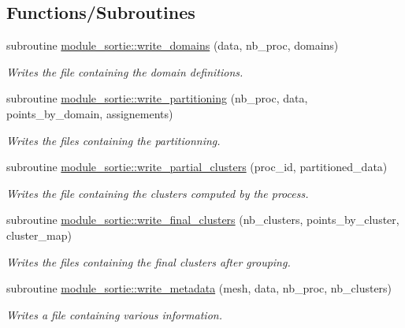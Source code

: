 \subsection*{Functions/\+Subroutines}
\begin{DoxyCompactItemize}
\item 
subroutine \hyperlink{namespacemodule__sortie_a835f7338c29161d6893c6bbddf4174f4}{module\+\_\+sortie\+::write\+\_\+domains} (data, nb\+\_\+proc, domains)
\begin{DoxyCompactList}\small\item\em Writes the file containing the domain definitions. \end{DoxyCompactList}\item 
subroutine \hyperlink{namespacemodule__sortie_abd1cdf529e5c71b3186c8d980e3d5117}{module\+\_\+sortie\+::write\+\_\+partitioning} (nb\+\_\+proc, data, points\+\_\+by\+\_\+domain, assignements)
\begin{DoxyCompactList}\small\item\em Writes the files containing the partitionning. \end{DoxyCompactList}\item 
subroutine \hyperlink{namespacemodule__sortie_a24e663b5fc236eee7c6fe434493e342e}{module\+\_\+sortie\+::write\+\_\+partial\+\_\+clusters} (proc\+\_\+id, partitioned\+\_\+data)
\begin{DoxyCompactList}\small\item\em Writes the file containing the clusters computed by the process. \end{DoxyCompactList}\item 
subroutine \hyperlink{namespacemodule__sortie_a819ceed76e9600e8eec63a7b730d1d92}{module\+\_\+sortie\+::write\+\_\+final\+\_\+clusters} (nb\+\_\+clusters, points\+\_\+by\+\_\+cluster, cluster\+\_\+map)
\begin{DoxyCompactList}\small\item\em Writes the files containing the final clusters after grouping. \end{DoxyCompactList}\item 
subroutine \hyperlink{namespacemodule__sortie_a3093c50035046621188d9a0da3b8a587}{module\+\_\+sortie\+::write\+\_\+metadata} (mesh, data, nb\+\_\+proc, nb\+\_\+clusters)
\begin{DoxyCompactList}\small\item\em Writes a file containing various information. \end{DoxyCompactList}\end{DoxyCompactItemize}
